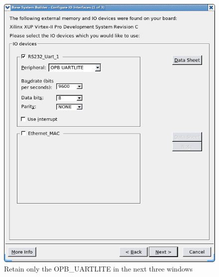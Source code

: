 \documentclass[a4paper,oneside]{memoir}
\begin{document}
\begin{figure}[H]
\centering
\includegraphics[scale=0.4]{BSB5}
\caption{Retain only the OPB\_UARTLITE in the next three windows\label{fig:BSB5}}
\end{figure}
\end{document}
